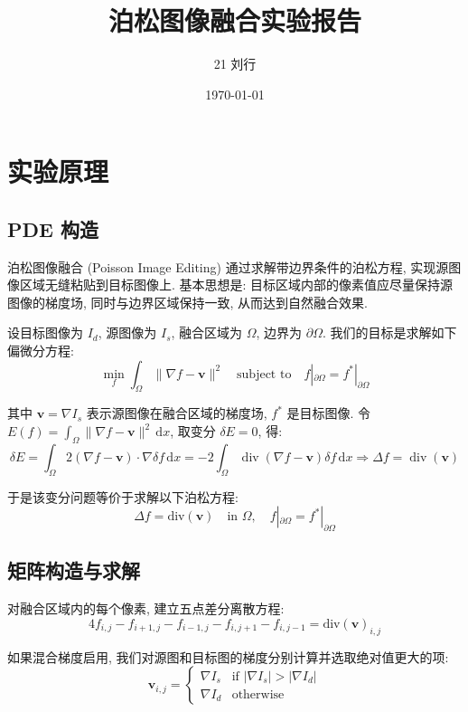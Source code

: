 \documentclass[11pt,a4paper]{article}
\title{泊松图像融合实验报告}
\author{21 刘行}
\date{\today}
\begin{document}
\maketitle

	\section{实验原理}
		\subsection{PDE 构造}
			泊松图像融合 (Poisson Image Editing) 通过求解带边界条件的泊松方程, 实现源图像区域无缝粘贴到目标图像上. 基本思想是: 目标区域内部的像素值应尽量保持源图像的梯度场, 同时与边界区域保持一致, 从而达到自然融合效果.

			设目标图像为 $I_d$, 源图像为 $I_s$, 融合区域为 $\Omega$, 边界为 $\partial\Omega$. 我们的目标是求解如下偏微分方程:
			\begin{equation*}
				\min_{f} \int_\Omega \|\nabla f - \mathbf{v}\|^2 \quad \text{subject to} \quad f|_{\partial\Omega} = f^*|_{\partial\Omega}
			\end{equation*}

			其中 $\mathbf{v} = \nabla I_s$ 表示源图像在融合区域的梯度场, $f^*$ 是目标图像. 令 $E(f) = \int_\Omega \|\nabla f - \mathbf{v}\|^2\,\text{d}x$, 取变分 $\delta E = 0$, 得:
			\begin{equation*}
				\delta E = \int_\Omega 2(\nabla f - \mathbf{v}) \cdot \nabla \delta f\,\text{d}x = -2\int_\Omega \operatorname{div}(\nabla f - \mathbf{v}) \delta f\,\text{d}x \Rightarrow \Delta f = \operatorname{div}(\mathbf{v})
			\end{equation*}

			于是该变分问题等价于求解以下泊松方程:
			\begin{equation*}
				\Delta f = \text{div}(\mathbf{v}) \quad \text{in } \Omega, \quad f|_{\partial\Omega} = f^*|_{\partial\Omega}
			\end{equation*}

		\subsection{矩阵构造与求解}
			对融合区域内的每个像素, 建立五点差分离散方程:
			\begin{equation*}
				4f_{i,j} - f_{i+1,j} - f_{i-1,j} - f_{i,j+1} - f_{i,j-1} = \text{div}(\mathbf{v})_{i,j}
			\end{equation*}

			如果混合梯度启用, 我们对源图和目标图的梯度分别计算并选取绝对值更大的项:
			\begin{equation*}
				\mathbf{v}_{i,j} =
				\begin{cases}
					\nabla I_s & \text{if } |\nabla I_s| > |\nabla I_d| \\
					\nabla I_d & \text{otherwise}
				\end{cases}
			\end{equation*}
\end{document}
